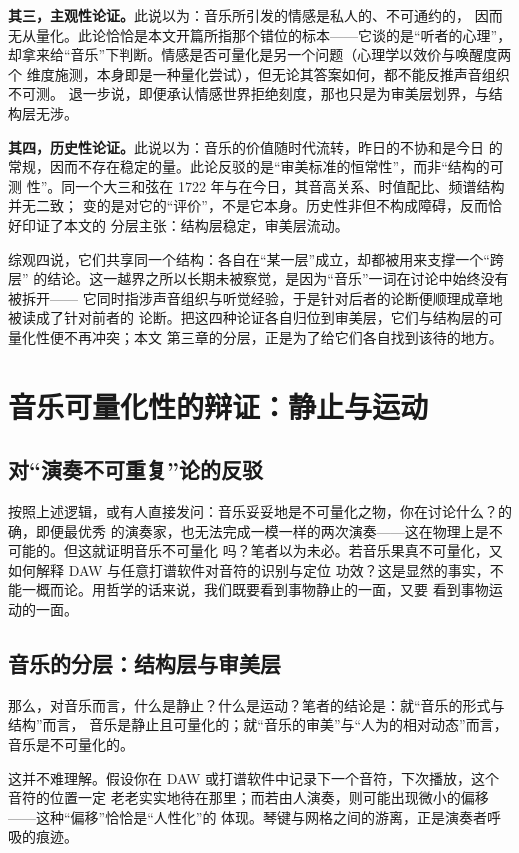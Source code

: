 \documentclass[11pt,a4paper,fontset=none]{ctexart}
\begin{document}
\textbf{其三，主观性论证。}此说以为：音乐所引发的情感是私人的、不可通约的，
因而无从量化。此论恰恰是本文开篇所指那个错位的标本——它谈的是“听者的心理”，
却拿来给“音乐”下判断。情感是否可量化是另一个问题（心理学以效价与唤醒度两个
维度施测，本身即是一种量化尝试），但无论其答案如何，都不能反推声音组织不可测。
退一步说，即便承认情感世界拒绝刻度，那也只是为审美层划界，与结构层无涉。

\textbf{其四，历史性论证。}此说以为：音乐的价值随时代流转，昨日的不协和是今日
的常规，因而不存在稳定的量。此论反驳的是“审美标准的恒常性”，而非“结构的可测
性”。同一个大三和弦在 1722 年与在今日，其音高关系、时值配比、频谱结构并无二致；
变的是对它的“评价”，不是它本身。历史性非但不构成障碍，反而恰好印证了本文的
分层主张：结构层稳定，审美层流动。

综观四说，它们共享同一个结构：各自在“某一层”成立，却都被用来支撑一个“跨层”
的结论。这一越界之所以长期未被察觉，是因为“音乐”一词在讨论中始终没有被拆开——
它同时指涉声音组织与听觉经验，于是针对后者的论断便顺理成章地被读成了针对前者的
论断。把这四种论证各自归位到审美层，它们与结构层的可量化性便不再冲突；本文
第三章的分层，正是为了给它们各自找到该待的地方。

\section{音乐可量化性的辩证：静止与运动}

\subsection{对“演奏不可重复”论的反驳}

按照上述逻辑，或有人直接发问：音乐妥妥地是不可量化之物，你在讨论什么？的确，即便最优秀
的演奏家，也无法完成一模一样的两次演奏——这在物理上是不可能的。但这就证明音乐不可量化
吗？笔者以为未必。若音乐果真不可量化，又如何解释 DAW 与任意打谱软件对音符的识别与定位
功效？这是显然的事实，不能一概而论。用哲学的话来说，我们既要看到事物静止的一面，又要
看到事物运动的一面。

\subsection{音乐的分层：结构层与审美层}

那么，对音乐而言，什么是静止？什么是运动？笔者的结论是：就“音乐的形式与结构”而言，
音乐是静止且可量化的；就“音乐的审美”与“人为的相对动态”而言，音乐是不可量化的。

这并不难理解。假设你在 DAW 或打谱软件中记录下一个音符，下次播放，这个音符的位置一定
老老实实地待在那里；而若由人演奏，则可能出现微小的偏移——这种“偏移”恰恰是“人性化”的
体现。琴键与网格之间的游离，正是演奏者呼吸的痕迹。
\end{document}

